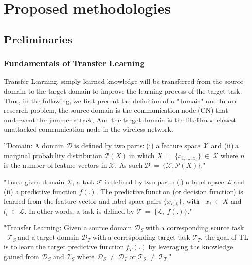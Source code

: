 \documentclass[letterpaper%
, twoside%
, 12pt%
,thesepararticles%
, english%
,creativecommons,hyperref, withAlgo2e%
]{thETS}
\begin{document}
\chapter{Proposed methodologies}

\section{Preliminaries}


\subsection{Fundamentals of Transfer Learning}


Transfer Learning, simply learned knowledge will be transferred from the source domain to the target domain to improve the learning process of the target task. Thus, in the following, we first present the definition of a "domain" and  In our research problem, the source domain is the communication node (CN) that underwent the jammer attack, And the target domain is the likelihood closest unattacked communication node in the wireless network.

\begin{definition}
''Domain: A domain $\displaystyle \mathcal{D}$ is defined by two parts: (i) a feature space $\displaystyle \mathcal{X}$ and (ii) a marginal probability distribution $\displaystyle \mathcal{P}( X)$ in which $\displaystyle X\ =\ \{x_{1,\dotsc ,x_{n}}\} \ \in \ \mathcal{X}$ where $\displaystyle n$ is the number of feature vectors in $\displaystyle \mathcal{X} .$ As such $\displaystyle \mathcal{D} \ =\ \{\mathcal{X} ,\mathcal{P}( X)\}$."
\end{definition}

\begin{definition}
"Task: given domain $\displaystyle \mathcal{D}$, a task $\displaystyle \mathcal{T}$ is defined by two parts: (i) a label space $\displaystyle \mathcal{L}$ and (ii) a predictive function $\displaystyle f( .)$. The predictive function (or decision function) is learned from the feature vector and label space pairs $\displaystyle \{x_{i,\ l_{i}}\}$, with \ $\displaystyle x_{i} \ \in \ X$ and $\displaystyle l_{i} \ \in \ \mathcal{L}$. In other words, a task is defined by $\displaystyle \mathcal{T} \ =\ \{\mathcal{L} ,\ f( .)\}$."
\end{definition}

\begin{definition}
"Transfer Learning: Given a source domain $\displaystyle \mathcal{D}_{S}$ with a corresponding source task \ $\displaystyle \mathcal{T}_{S}$ and a target domain $\displaystyle \mathcal{D}_{T}$ with a corresponding target task $\displaystyle \mathcal{T}_{T}$, the goal of TL is to learn the target predictive function $\displaystyle f_{T}( .)$ by leveraging the knowledge gained from $\displaystyle \mathcal{D}_{S}$ and $\displaystyle \mathcal{T}_{S}$ where $\displaystyle \mathcal{D}_{S} \ \neq \ \mathcal{D}_{T}$ or $\displaystyle \mathcal{T}_{S} \ \neq \ \mathcal{T}_{T}$."
\end{definition}
\end{document}
